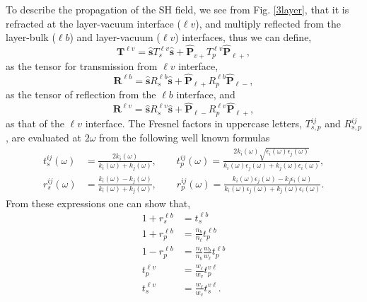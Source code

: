 To describe the propagation of the SH field, we  see from
Fig. \ref{3layer}, that it is refracted at the 
layer-vacuum interface ($\ell v$), and multiply reflected from the
layer-bulk ($\ell b$)
and layer-vacuum ($\ell v$)
interfaces, thus we can define,
\begin{equation}\label{r5}
\mathbf{T}^{\ell v}
= \hat{\mathbf{s}}T_s^{\ell v}\hat{\mathbf{s}} 
+ \hat{\mathbf{P}}_{v+}T_{p}^{\ell v} \hat{\mathbf{P}}_{\ell +},
\end{equation}
as the tensor for transmission from $\ell v$ interface,
\begin{equation}\label{r6}
\mathbf{R}^{\ell b}
= \hat{\mathbf{s}}R_s^{\ell b}\hat{\mathbf{s}}
+ \hat{\mathbf{P}}_{\ell +}R_{p}^{\ell b} \hat{\mathbf{P}}_{\ell -},
\end{equation} 
as the tensor of reflection from the $\ell b$ interface, 
and
\begin{equation}\label{r6b}
\mathbf{R}^{\ell v}
= \hat{\mathbf{s}}R_s^{\ell v}\hat{\mathbf{s}}
+ \hat{\mathbf{P}}_{\ell -}R_{p}^{\ell v} \hat{\mathbf{P}}_{\ell +},
\end{equation} 
as that of the $\ell v$ interface. 
The Fresnel factors in uppercase letters, $T^{ij}_{s,p}$ and $R^{ij}_{s,p}$,
are evaluated at $2\omega$  from the following well known formulas 
\begin{equation}\label{e.f1}
\begin{split}
t_s^{ij}(\omega) &=
\frac{2k_{i}(\omega)}{k_{i}(\omega)+k_{j}(\omega)},
\quad\quad  
t_{p}^{ij}(\omega) =
\frac{2k_{i}(\omega)\sqrt{\epsilon_{i}(\omega)\epsilon_j(\omega)}}
     {k_{i}(\omega)\epsilon_{j}(\omega)+k_{j}(\omega)\epsilon_{i}(\omega)},\\
r_s^{ij}(\omega) &=
\frac{k_{i}(\omega) - k_{j}(\omega)}
     {k_{i}(\omega) + k_{j}(\omega)},
\quad\quad 
r_{p}^{ij}(\omega) =
\frac{k_{i}(\omega)\epsilon_{j}(\omega) - k_{j}\epsilon_{i}(\omega)}
     {k_{i}(\omega)\epsilon_{j}(\omega) + k_{j}(\omega)\epsilon_{i}(\omega)}. 
\end{split}
\end{equation}
From these expressions one can show that,
\begin{align}\label{mf}
1 + r^{\ell b}_{s} &= t^{\ell b}_{s}\nonumber\\
1 + r^{\ell b}_{p}
&= \frac{n_b}{n_\ell}
t^{\ell b}_{p} 
\nonumber\\
1 - r^{\ell b}_{p}
&= \frac{n_\ell}{n_b}
   \frac{w_{b}}{w_{\ell}}t^{\ell b}_{p}\\
t^{\ell v}_{p} &= \frac{w_{\ell}}{w_{v}}t^{v\ell}_{p}\nonumber\\
t^{\ell v}_{s} &= \frac{w_{\ell}}{w_{v}}t^{v\ell}_{s}\nonumber 
.
\end{align}


